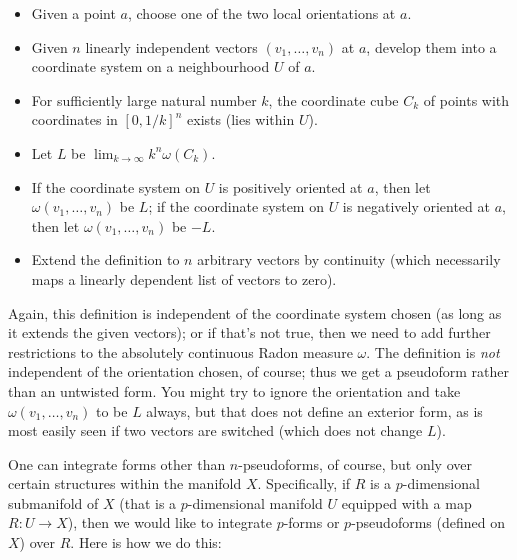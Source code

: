 \documentclass[preprint, 5p, 10pt]{elsarticle}
\theoremstyle{plain}
\begin{document}
\begin{itemize}%
\item Given a point $a$, choose one of the two local orientations at $a$.
\item Given $n$ linearly independent vectors $(v_1,\ldots,v_n)$ at $a$, develop them into a coordinate system on a neighbourhood $U$ of $a$.
\item For sufficiently large natural number $k$, the coordinate cube $C_k$ of points with coordinates in $[0,1/k]^n$ exists (lies within $U$).
\item Let $L$ be $\lim_{k \to \infty} k^n \omega(C_k)$.
\item If the coordinate system on $U$ is positively oriented at $a$, then let $\omega(v_1,\ldots,v_n)$ be $L$; if the coordinate system on $U$ is negatively oriented at $a$, then let $\omega(v_1,\ldots,v_n)$ be $-L$.
\item Extend the definition to $n$ arbitrary vectors by continuity (which necessarily maps a linearly dependent list of vectors to zero).

\end{itemize}
Again, this definition is independent of the coordinate system chosen (as long as it extends the given vectors); or if that'{}s not true, then we need to add further restrictions to the absolutely continuous Radon measure $\omega$. The definition is \emph{not} independent of the orientation chosen, of course; thus we get a pseudoform rather than an untwisted form. You might try to ignore the orientation and take $\omega(v_1,\ldots,v_n)$ to be $L$ always, but that does not define an exterior form, as is most easily seen if two vectors are switched (which does not change $L$).

One can integrate forms other than $n$-pseudoforms, of course, but only over certain structures within the manifold $X$. Specifically, if $R$ is a $p$-dimensional submanifold of $X$ (that is a $p$-dimensional manifold $U$ equipped with a map $R: U \to X$), then we would like to integrate $p$-forms or $p$-pseudoforms (defined on $X$) over $R$. Here is how we do this:
\end{document}
